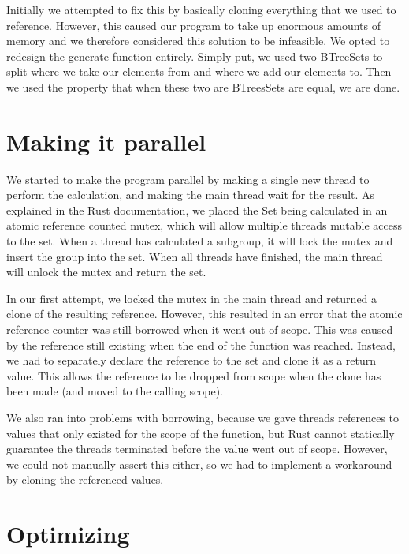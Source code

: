 \documentclass{article}
\begin{document}
Initially we attempted to fix this by basically cloning everything that we used to reference. However, this
caused our program to take up enormous amounts of memory and we therefore considered this solution to be
infeasible. We opted to redesign the generate function entirely. Simply put, we used two BTreeSets to split
where we take our elements from and where we add our elements to. Then we used the property that when these
two are BTreesSets are equal, we are done.

\section{Making it parallel}

We started to make the program parallel by making a single new thread to perform the calculation, and making the main thread wait for the result. As explained in the Rust documentation, we placed the Set being calculated in an atomic reference counted mutex, which will allow multiple threads mutable access to the set. When a thread has calculated a subgroup, it will lock the mutex and insert the group into the set. When all threads have finished, the main thread will unlock the mutex and return the set.

In our first attempt, we locked the mutex in the main thread and returned a clone of the resulting reference. However, this resulted in an error that the atomic reference counter was still borrowed when it went out of scope. This was caused by the reference still existing when the end of the function was reached. Instead, we had to separately declare the reference to the set and clone it as a return value. This allows the reference to be dropped from scope when the clone has been made (and moved to the calling scope).

We also ran into problems with borrowing, because we gave threads references to values that only existed for the scope of the function, but Rust cannot statically guarantee the threads terminated before the value went out of scope. However, we could not manually assert this either, so we had to implement a workaround by cloning the referenced values.


\section{Optimizing}
\end{document}
